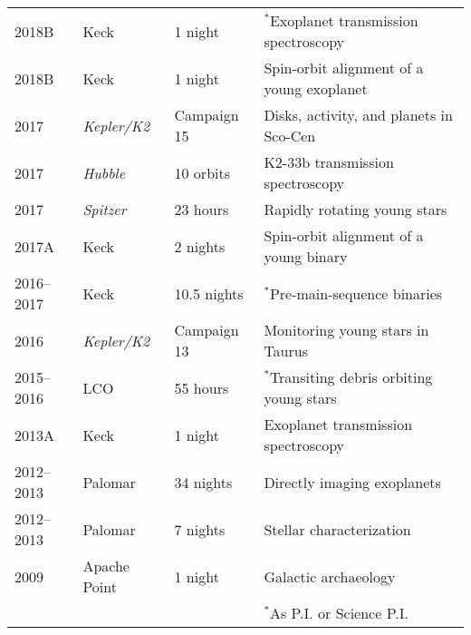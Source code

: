 \begin{tabular}{llll}
2018B & Keck & 1 night & $^*$Exoplanet transmission spectroscopy\\%
2018B & Keck & 1 night & Spin-orbit alignment of a young exoplanet\\%
2017 & \textit{Kepler/K2} & Campaign 15 & Disks, activity, and planets in Sco-Cen\\%
2017 & \textit{Hubble} & 10 orbits & K2-33b transmission spectroscopy\\%
2017 & \textit{Spitzer} & 23 hours & Rapidly rotating young stars\\%
2017A & Keck & 2 nights & Spin-orbit alignment of a young binary\\%
2016--2017 & Keck & 10.5 nights & $^*$Pre-main-sequence binaries\\%
2016 & \textit{Kepler/K2} & Campaign 13 & Monitoring young stars in Taurus\\%
2015--2016 & LCO & 55 hours & $^*$Transiting debris orbiting young stars\\%
2013A & Keck & 1 night & Exoplanet transmission spectroscopy\\%
2012--2013 & Palomar & 34 nights & Directly imaging exoplanets\\%
2012--2013 & Palomar & 7 nights & Stellar characterization\\%
2009 & Apache Point & 1 night & Galactic archaeology\\%
& & & $^*$As P.I. or Science P.I. \\
\end{tabular}